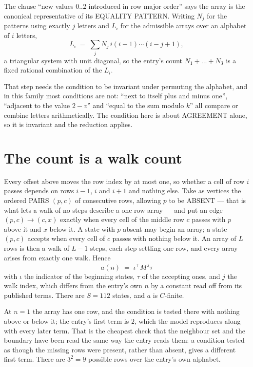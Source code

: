 \documentclass[11pt,a4paper]{article}
\theoremstyle{plain}
\theoremstyle{definition}
\begin{document}
The clause ``new values $0..2$ introduced in row major order'' says the array is the
canonical representative of its EQUALITY PATTERN. Writing $N_j$ for the patterns using exactly
$j$ letters and $L_i$ for the admissible arrays over an alphabet of $i$ letters,
\[
L_i\;=\;\sum_j N_j\,i(i-1)\cdots(i-j+1),
\]
a triangular system with unit diagonal, so the entry's count $N_1+\dots+N_{3}$ is a
fixed rational combination of the $L_i$.

That step needs the condition to be invariant under permuting the alphabet, and in this family
most conditions are not: ``next to itself plus and minus one'', ``adjacent to the value
$2-v$'' and ``equal to the sum modulo $k$'' all compare or combine letters arithmetically.
The condition here is about AGREEMENT alone, so it is invariant and the reduction applies.

\section{The count is a walk count}

Every offset above moves the row index by at most one, so whether a cell of row $i$ passes
depends on rows $i-1$, $i$ and $i+1$ and nothing else. Take as vertices the ordered PAIRS
$(p,c)$ of consecutive rows, allowing $p$ to be ABSENT --- that is what lets a walk of no steps
describe a one-row array --- and put an edge $(p,c)\to(c,x)$ exactly when every cell of the
middle row $c$ passes with $p$ above it and $x$ below it. A state with $p$ absent may begin an
array; a state $(p,c)$ accepts when every cell of $c$ passes with nothing below it. An array of
$L$ rows is then a walk of $L-1$ steps, each step settling one row, and every array arises from
exactly one walk. Hence
\[
a(n)\;=\;\iota^{\!\top}M^{\,j}\tau
\]
with $\iota$ the indicator of the beginning states, $\tau$ of the accepting ones, and $j$ the
walk index, which differs from the entry's own $n$ by a constant read off from its published
terms. There are $S=112$ states, and $a$ is $C$-finite.

At $n=1$ the array has one row, and
the condition is tested there with nothing above or below it; the entry's first term is
$2$, which the model reproduces along with every later term. That is the cheapest check
that the neighbour set and the boundary have been read the same way the entry reads them: a
condition tested as though the missing rows were present, rather than absent, gives a different
first term. There are $3^{2}=9$ possible rows over the entry's own alphabet.
\end{document}
